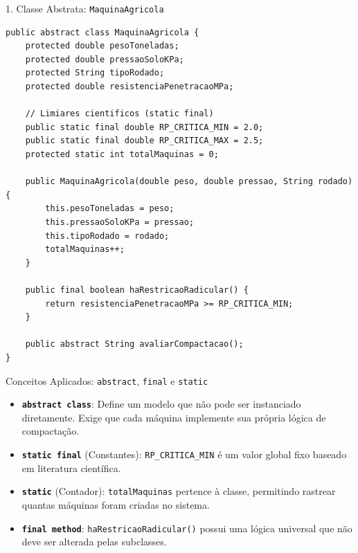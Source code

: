 \documentclass[9pt]{beamer}
\begin{document}
\begin{frame}[fragile]{1. Classe Abstrata: \texttt{MaquinaAgricola}}
\begin{lstlisting}[basicstyle=\tiny]
public abstract class MaquinaAgricola {
    protected double pesoToneladas;
    protected double pressaoSoloKPa;
    protected String tipoRodado;
    protected double resistenciaPenetracaoMPa;

    // Limiares cientificos (static final)
    public static final double RP_CRITICA_MIN = 2.0;
    public static final double RP_CRITICA_MAX = 2.5;
    protected static int totalMaquinas = 0;

    public MaquinaAgricola(double peso, double pressao, String rodado) {
        this.pesoToneladas = peso;
        this.pressaoSoloKPa = pressao;
        this.tipoRodado = rodado;
        totalMaquinas++;
    }

    public final boolean haRestricaoRadicular() {
        return resistenciaPenetracaoMPa >= RP_CRITICA_MIN;
    }

    public abstract String avaliarCompactacao();
}
\end{lstlisting}
\end{frame}

\begin{frame}{Conceitos Aplicados: \texttt{abstract}, \texttt{final} e \texttt{static}}
    \begin{itemize}
        \item \textbf{\texttt{abstract class}}: Define um modelo que não pode ser instanciado diretamente. Exige que cada máquina implemente sua própria lógica de compactação.
        \item \textbf{\texttt{static final}} (Constantes): \texttt{RP\_CRITICA\_MIN} é um valor global fixo baseado em literatura científica.
        \item \textbf{\texttt{static}} (Contador): \texttt{totalMaquinas} pertence à classe, permitindo rastrear quantas máquinas foram criadas no sistema.
        \item \textbf{\texttt{final method}}: \texttt{haRestricaoRadicular()} possui uma lógica universal que não deve ser alterada pelas subclasses.
    \end{itemize}
\end{frame}
\end{document}
